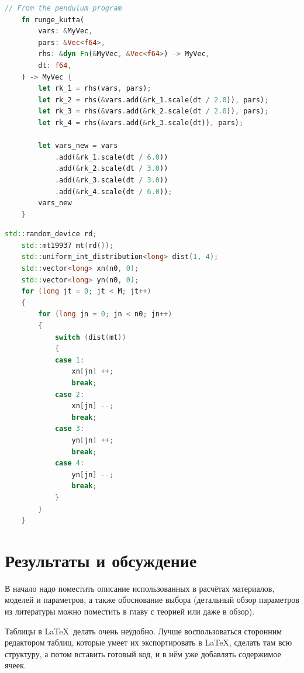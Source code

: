 \documentclass[14pt,oneside]{extarticle}
\begin{document}
\begin{lstlisting}[language=rust,caption={Программная реализация метода Рунге-Кутты},label={listing-1}]
    // From the pendulum program
    fn runge_kutta(
        vars: &MyVec,
        pars: &Vec<f64>,
        rhs: &dyn Fn(&MyVec, &Vec<f64>) -> MyVec,
        dt: f64,
    ) -> MyVec {
        let rk_1 = rhs(vars, pars);
        let rk_2 = rhs(&vars.add(&rk_1.scale(dt / 2.0)), pars);
        let rk_3 = rhs(&vars.add(&rk_2.scale(dt / 2.0)), pars);
        let rk_4 = rhs(&vars.add(&rk_3.scale(dt)), pars);
    
        let vars_new = vars
            .add(&rk_1.scale(dt / 6.0))
            .add(&rk_2.scale(dt / 3.0))
            .add(&rk_3.scale(dt / 3.0))
            .add(&rk_4.scale(dt / 6.0));
        vars_new
    }
    \end{lstlisting}
    
    \begin{lstlisting}[language=C++,caption={Подпрограмма случайного блуждания на плоскости},label={listing-2}]
    std::random_device rd;
    std::mt19937 mt(rd());
    std::uniform_int_distribution<long> dist(1, 4);
    std::vector<long> xn(n0, 0);
    std::vector<long> yn(n0, 0);
    for (long jt = 0; jt < M; jt++)
    {
        for (long jn = 0; jn < n0; jn++)
        {
            switch (dist(mt))
            {
            case 1:
                xn[jn] ++;
                break;
            case 2:
                xn[jn] --;
                break;
            case 3:
                yn[jn] ++;
                break;
            case 4:
                yn[jn] --;
                break;
            }
        }
    }
\end{lstlisting}

\pagebreak
\section{Результаты и обсуждение}

В начало надо поместить описание использованных в расчётах материалов, моделей и параметров, а также обоснование выбора (детальный обзор параметров из литературы можно поместить в главу с теорией или даже в обзор).

Таблицы в \LaTeX ~делать очень неудобно. Лучше воспользоваться сторонним редактором таблиц, которые умеет их экспортировать в \LaTeX, сделать там всю структуру, а потом вставить готовый код, и в нём уже добавлять содержимое ячеек.
\end{document}
